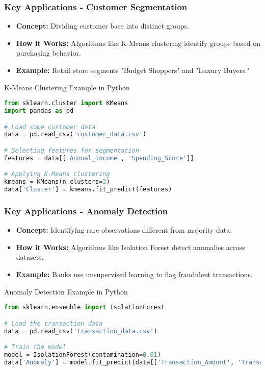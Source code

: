 \documentclass{beamer}
\begin{document}
\begin{frame}[fragile]
    \frametitle{Key Applications - Customer Segmentation}
    \begin{itemize}
        \item \textbf{Concept:} Dividing customer base into distinct groups.
        \item \textbf{How it Works:} Algorithms like K-Means clustering identify groups based on purchasing behavior.
        \item \textbf{Example:} Retail store segments "Budget Shoppers" and "Luxury Buyers."
    \end{itemize}
    \begin{block}{K-Means Clustering Example in Python}
        \begin{lstlisting}[language=Python]
from sklearn.cluster import KMeans
import pandas as pd

# Load some customer data
data = pd.read_csv('customer_data.csv')

# Selecting features for segmentation
features = data[['Annual_Income', 'Spending_Score']]

# Applying K-Means clustering
kmeans = KMeans(n_clusters=3)
data['Cluster'] = kmeans.fit_predict(features)
        \end{lstlisting}
    \end{block}
\end{frame}

\begin{frame}[fragile]
    \frametitle{Key Applications - Anomaly Detection}
    \begin{itemize}
        \item \textbf{Concept:} Identifying rare observations different from majority data.
        \item \textbf{How it Works:} Algorithms like Isolation Forest detect anomalies across datasets.
        \item \textbf{Example:} Banks use unsupervised learning to flag fraudulent transactions.
    \end{itemize}
    \begin{block}{Anomaly Detection Example in Python}
        \begin{lstlisting}[language=Python]
from sklearn.ensemble import IsolationForest

# Load the transaction data
data = pd.read_csv('transaction_data.csv')

# Train the model
model = IsolationForest(contamination=0.01)
data['Anomaly'] = model.fit_predict(data[['Transaction_Amount', 'Transaction_Time']])
        \end{lstlisting}
    \end{block}
\end{frame}
\end{document}
